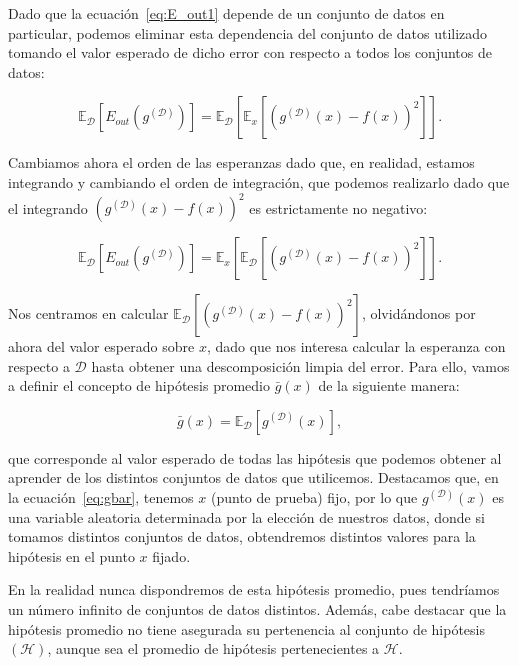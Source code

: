 Dado que la ecuación~\eqref{eq:E_out1} depende de un conjunto de datos en particular, podemos eliminar esta dependencia del conjunto de datos utilizado tomando el valor esperado de dicho error con respecto a todos los conjuntos de datos:

\begin{equation}\label{eq:E_out2}
    \mathbb{E}_{\mathcal{D}}[E_{out}(g^{\mathcal{(D)}})] = \mathbb{E}_{\mathcal{D}}[\mathbb{E}_{x}[{(g^{\mathcal{(D)}}(x) - f(x))}^2]]. 
\end{equation}

Cambiamos ahora el orden de las esperanzas dado que, en realidad, estamos integrando y cambiando el orden de integración, que podemos realizarlo dado que el integrando ${(g^{\mathcal{(D)}}(x) - f(x))}^2$ es estrictamente no negativo:

\begin{equation}\label{eq:E_out3}
    \mathbb{E}_{\mathcal{D}}[E_{out}(g^{\mathcal{(D)}})] = \mathbb{E}_{x}[\mathbb{E}_{\mathcal{D}}[{(g^{\mathcal{(D)}}(x) - f(x))}^2]].
\end{equation}

Nos centramos en calcular $\mathbb{E}_{\mathcal{D}}[{(g^{\mathcal{(D)}}(x) - f(x))}^2]$, olvidándonos por ahora del valor esperado sobre $x$, dado que nos interesa calcular la esperanza con respecto a $\mathcal{D}$ hasta obtener una descomposición limpia del error. Para ello, vamos a definir el concepto de hipótesis promedio $\bar{g}(x)$ de la siguiente manera:

\begin{equation}\label{eq:gbar}
    \bar{g}(x) = \mathbb{E}_{\mathcal{D}}[g^{\mathcal{(D)}}(x)],
\end{equation}

que corresponde al valor esperado de todas las hipótesis que podemos obtener al aprender de los distintos conjuntos de datos que utilicemos. Destacamos que, en la ecuación~\eqref{eq:gbar}, tenemos $x$ (punto de prueba) fijo, por lo que $g^{\mathcal{(D)}}(x)$ es una variable aleatoria determinada por la elección de nuestros datos, donde si tomamos distintos conjuntos de datos, obtendremos distintos valores para la hipótesis en el punto $x$ fijado. 

En la realidad nunca dispondremos de esta hipótesis promedio, pues tendríamos un número infinito de conjuntos de datos distintos. Además, cabe destacar que la hipótesis promedio no tiene asegurada su pertenencia al conjunto de hipótesis $\mathcal{(H)}$, aunque sea el promedio de hipótesis pertenecientes a $\mathcal{H}$.

